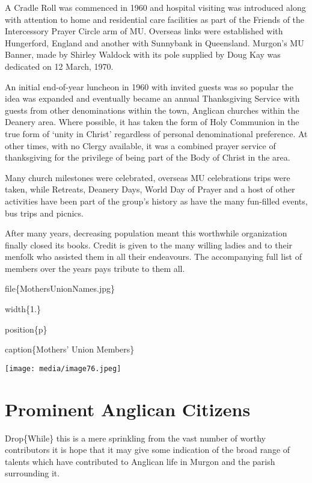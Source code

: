 A Cradle Roll was commenced in 1960 and hospital visiting was introduced along with attention to home and residential care facilities as part of the Friends of the Intercessory Prayer Circle arm of MU. Overseas links were established with Hungerford, England and another with Sunnybank in Queensland. Murgon's MU Banner, made by Shirley Waldock with its pole supplied by Doug Kay was dedicated on 12 March, 1970.

An initial end-of-year luncheon in 1960 with invited guests was so popular the idea was expanded and eventually became an annual Thanksgiving Service with guests from other denominations within the town, Anglican churches within the Deanery area. Where possible, it has taken the form of Holy Communion in the true form of `unity in Christ' regardless of personal denominational preference. At other times, with no Clergy available, it was a combined prayer service of thanksgiving for the privilege of being part of the Body of Christ in the area.

Many church milestones were celebrated, overseas MU celebrations trips were taken, while Retreats, Deanery Days, World Day of Prayer and a host of other activities have been part of the group's history as have the many fun-filled events, bus trips and picnics.

After many years, decreasing population meant this worthwhile organization finally closed its books. Credit is given to the many willing ladies and to their menfolk who assisted them in all their endeavours. The accompanying full list of members over the years pays tribute to them all.

file\{MothersUnionNames.jpg\}

width\{1.\}

position\{p\}

caption\{Mothers' Union Members\}

\texttt{[image: media/image76.jpeg]}

\hypertarget{prominent-anglican-citizens}{%
\chapter{Prominent Anglican Citizens}\label{prominent-anglican-citizens}}

Drop\{While\} this is a mere sprinkling from the vast number of worthy contributors it is hope that it may give some indication of the broad range of talents which have contributed to Anglican life in Murgon and the parish surrounding it.

